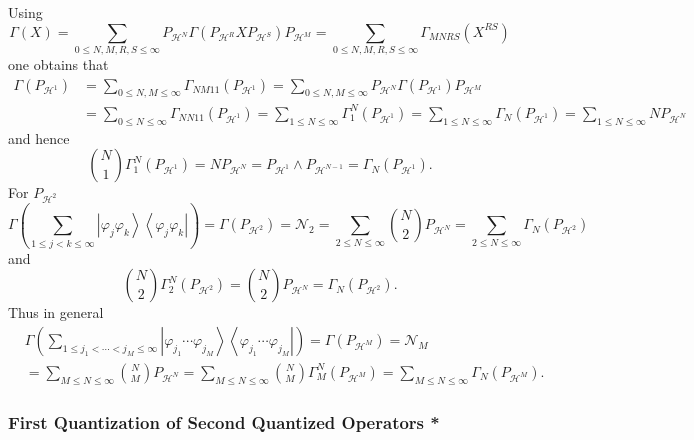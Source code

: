 \documentclass[aps,preprint]{revtex4}%
\begin{document}
Using
\begin{equation}
\Gamma\left(  X\right)  =\sum_{0\leq N,M,R,S\leq\infty}P_{\mathcal{H}^{N}%
}\Gamma\left(  P_{\mathcal{H}^{R}}XP_{\mathcal{H}^{S}}\right)  P_{\mathcal{H}%
^{M}}=\sum_{0\leq N,M,R,S\leq\infty}\Gamma_{MNRS}\left(  X^{RS}\right)
\nonumber
\end{equation}
one obtains that
\begin{align}
\Gamma\left(  P_{\mathcal{H}^{1}}\right)   &  =\sum_{0\leq N,M\leq\infty
}\Gamma_{NM11}\left(  P_{\mathcal{H}^{1}}\right)  =\sum_{0\leq N,M\leq\infty
}P_{\mathcal{H}^{N}}\Gamma\left(  P_{\mathcal{H}^{1}}\right)  P_{\mathcal{H}%
^{M}}\nonumber\\
&  =\sum_{0\leq N\leq\infty}\Gamma_{NN11}\left(  P_{\mathcal{H}^{1}}\right)
=\sum_{1\leq N\leq\infty}\Gamma_{1}^{N}\left(  P_{\mathcal{H}^{1}}\right)
=\sum_{1\leq N\leq\infty}\Gamma_{N}\left(  P_{\mathcal{H}^{1}}\right)
=\sum_{1\leq N\leq\infty}NP_{\mathcal{H}^{N}}%
\end{align}
and hence
\[
\binom{N}{1}\Gamma_{1}^{N}\left(  P_{\mathcal{H}^{1}}\right)  =NP_{\mathcal{H}%
^{N}}=P_{\mathcal{H}^{1}}\wedge P_{\mathcal{H}^{N-1}}=\Gamma_{N}\left(
P_{\mathcal{H}^{1}}\right)  .
\]
For $P_{\mathcal{H}^{2}}$
\begin{equation}
\Gamma\left(  \sum_{1\leq j<k\leq\infty}\left\vert \varphi_{j}\varphi
_{k}\right\rangle \left\langle \varphi_{j}\varphi_{k}\right\vert \right)
=\Gamma\left(  P_{\mathcal{H}^{2}}\right)  =\mathcal{N}_{2}=\sum_{2\leq
N\leq\infty}\binom{N}{2}P_{\mathcal{H}^{N}}=\sum_{2\leq N\leq\infty}\Gamma
_{N}\left(  P_{\mathcal{H}^{2}}\right)
\end{equation}
and
\[
\binom{N}{2}\Gamma_{2}^{N}\left(  P_{\mathcal{H}^{2}}\right)  =\binom{N}%
{2}P_{\mathcal{H}^{N}}=\Gamma_{N}\left(  P_{\mathcal{H}^{2}}\right)  .
\]
Thus in general
\begin{align}
&  \Gamma\left(  \sum_{1\leq j_{1}<\cdots<j_{M}\leq\infty}\left\vert
\varphi_{j_{1}}\cdots\varphi_{j_{M}}\right\rangle \left\langle \varphi_{j_{1}%
}\cdots\varphi_{j_{M}}\right\vert \right)  =\Gamma\left(  P_{\mathcal{H}^{M}%
}\right)  =\mathcal{N}_{M}\nonumber\\
&  =\sum_{M\leq N\leq\infty}\binom{N}{M}P_{\mathcal{H}^{N}}=\sum_{M\leq
N\leq\infty}\binom{N}{M}\Gamma_{M}^{N}\left(  P_{\mathcal{H}^{M}}\right)
=\sum_{M\leq N\leq\infty}\Gamma_{N}\left(  P_{\mathcal{H}^{M}}\right)  .
\end{align}


\subsubsection{First Quantization of Second Quantized Operators *}
\end{document}
